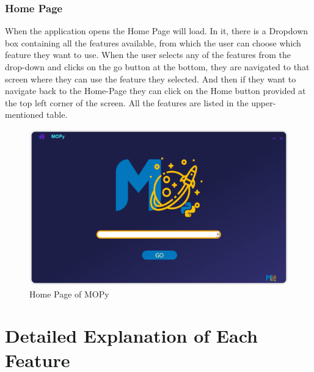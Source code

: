 \documentclass[12pt]{article}
\begin{document}
\subsubsection{Home Page}
When the application opens the Home Page will load. In it, there is a Dropdown box containing all the features available, from which the user can choose which feature they want to use. When the user selects any of the features from the drop-down and clicks on the go button at the bottom, they are navigated to that screen where they can use the feature they selected. And then if they want to navigate back to the Home-Page they can click on the Home button provided at the top left corner of the screen. All the features are listed in the upper-mentioned table.
\begin{figure}[H]
\centering
\includegraphics[scale=0.6]{homepage.png}
\caption{Home Page of MOPy} \label{home}
\end{figure}
\section{Detailed Explanation of Each Feature}
\end{document}
